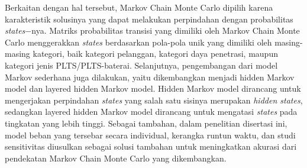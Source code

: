 {{{{{{Berkaitan dengan hal tersebut, Markov Chain Monte Carlo dipilih karena karakteristik solusinya yang dapat melakukan perpindahan dengan probabilitas \textit{states}$-$nya. Matriks probabilitas transisi yang dimiliki oleh Markov Chain Monte Carlo menggerakkan \textit{states} berdasarkan pola-pola unik yang dimiliki oleh masing-masing kategori, baik kategori pelanggan, kategori daya penetrasi, maupun kategori jenis PLTS/PLTS-baterai. Selanjutnya, pengembangan dari model Markov sederhana juga dilakukan, yaitu dikembangkan menjadi hidden Markov model dan layered hidden Markov model. Hidden Markov model dirancang untuk mengerjakan perpindahan \textit{states} yang salah satu sisinya merupakan \textit{hidden states}, sedangkan layered hidden Markov model dirancang untuk mengatasi \textit{states} pada tingkatan yang lebih tinggi. Sebagai tambahan, dalam penelitian disertasi ini, model beban yang tersebar secara individual, kerangka runtun waktu, dan studi sensitivitas diusulkan sebagai solusi tambahan untuk meningkatkan akurasi dari pendekatan Markov Chain Monte Carlo yang dikembangkan.

}}}}}}
